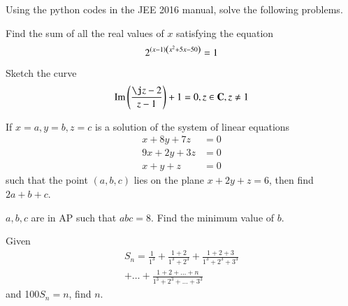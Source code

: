 \documentclass[journal,12pt,twocolumn]{IEEEtran}
\begin{document}
Using the python codes in the JEE 2016 manual, solve the following problems.
\begin{problem}
Find the sum of all the real values of
$x$ satisfying the equation
%
\begin{equation}
2^{\left(x-1\right)\left(x^2+5x-50\right)} = 1
\end{equation}
%
\end{problem}
%
%
%
%
\begin{problem}
Sketch the curve
%
\begin{equation}
\text{Im}\brak{\frac{\j z -2}{z-1}} +1 = 0, z \in \mbf{C}, z \neq 1
\end{equation}
%
\end{problem}
%
%
\begin{problem}
If $x = a, y = b, z = c$ is a solution of the system of linear equations 
%
\begin{equation}
\begin{split}
x + 8y + 7z &= 0
\\
9x + 2y + 3z &= 0
\\
x + y + z &= 0
\end{split}
\end{equation}
%
such that the point $(a, b, c)$ lies on the plane $x+2y+
z = 6$, then find $2a + b + c$.
%
\end{problem}
%
%
\begin{problem}
$a, b, c$ are in AP such that $abc = 8$. Find
the minimum value of $b$.
\end{problem}
%
%
\begin{problem}
Given
%
\begin{multline}
S_n = \frac{1}{1^3}+\frac{1+2}{1^3+2^3}+\frac{1+2+3}{1^3+2^3+3^3}
\\
+ \dots + \frac{1+2+\dots+n}{1^3+2^3+\dots+3^3}
\end{multline}
%
and 1$00S_n = n$, find $n$.
\end{problem}
\end{document}
